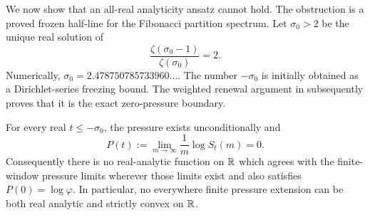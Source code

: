 We now show that an all-real analyticity ansatz cannot hold.  The obstruction
is a proved frozen half-line for the Fibonacci partition spectrum.  Let
\(\sigma_0>2\) be the unique real solution of
\begin{equation}
 \frac{\zeta(\sigma_0-1)}{\zeta(\sigma_0)}=2.
 \label{eq:freezing-exponent}
\end{equation}
Numerically, \(\sigma_0=2.478750785733960\ldots\).
The number \(-\sigma_0\) is initially obtained as a Dirichlet-series freezing
bound.  The weighted renewal argument in
 subsequently proves that it is the exact
zero-pressure boundary.

\begin{theorem}
\label{thm:negative-temperature-freezing}
For every real \(t\le-\sigma_0\), the pressure exists unconditionally and
\[
 P(t):=\lim_{m\to\infty}\frac1m\log S_t(m)=0.
\]
Consequently there is no real-analytic function on \(\mathbb{R}\) which agrees with
the finite-window pressure limits wherever those limits exist and also
satisfies \(P(0)=\log\varphi\).  In particular, no everywhere finite pressure
extension can be both real analytic and strictly convex on \(\mathbb{R}\).
\end{theorem}

